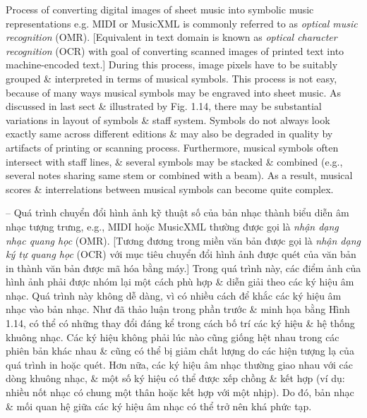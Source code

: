 \documentclass{article}
\begin{document}
\begin{itemize}
\begin{itemize}
\begin{itemize}
			Process of converting digital images of sheet music into symbolic music representations e.g. MIDI or MusicXML is commonly referred to as {\it optical music recognition} (OMR). [Equivalent in text domain is known as {\it optical character recognition} (OCR) with goal of converting scanned images of printed text into machine-encoded text.] During this process, image pixels have to be suitably grouped \& interpreted in terms of musical symbols. This process is not easy, because of many ways musical symbols may be engraved into sheet music. As discussed in last sect \& illustrated by {\sf Fig. 1.14}, there may be substantial variations in layout of symbols \& staff system. Symbols do not always look exactly same across different editions \& may also be degraded in quality by artifacts of printing or scanning process. Furthermore, musical symbols often intersect with staff lines, \& several symbols may be stacked \& combined (e.g., several notes sharing same stem or combined with a beam). As a result, musical scores \& interrelations between musical symbols can become quite complex.
			
			-- Quá trình chuyển đổi hình ảnh kỹ thuật số của bản nhạc thành biểu diễn âm nhạc tượng trưng, e.g., MIDI hoặc MusicXML thường được gọi là {\it nhận dạng nhạc quang học} (OMR). [Tương đương trong miền văn bản được gọi là {\it nhận dạng ký tự quang học} (OCR) với mục tiêu chuyển đổi hình ảnh được quét của văn bản in thành văn bản được mã hóa bằng máy.] Trong quá trình này, các điểm ảnh của hình ảnh phải được nhóm lại một cách phù hợp \& diễn giải theo các ký hiệu âm nhạc. Quá trình này không dễ dàng, vì có nhiều cách để khắc các ký hiệu âm nhạc vào bản nhạc. Như đã thảo luận trong phần trước \& minh họa bằng {\sf Hình 1.14}, có thể có những thay đổi đáng kể trong cách bố trí các ký hiệu \& hệ thống khuông nhạc. Các ký hiệu không phải lúc nào cũng giống hệt nhau trong các phiên bản khác nhau \& cũng có thể bị giảm chất lượng do các hiện tượng lạ của quá trình in hoặc quét. Hơn nữa, các ký hiệu âm nhạc thường giao nhau với các dòng khuông nhạc, \& một số ký hiệu có thể được xếp chồng \& kết hợp (ví dụ: nhiều nốt nhạc có chung một thân hoặc kết hợp với một nhịp). Do đó, bản nhạc \& mối quan hệ giữa các ký hiệu âm nhạc có thể trở nên khá phức tạp.
			

\end{itemize}
\end{itemize}
\end{itemize}
\end{document}
